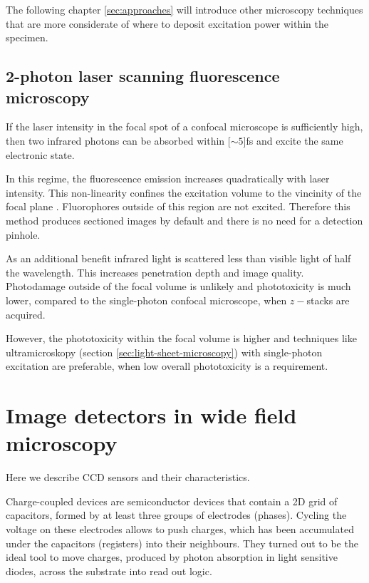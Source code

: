 The following chapter \ref{sec:approaches} will introduce other
microscopy techniques that are more considerate of where to deposit
excitation power within the specimen.
\subsection{2-photon laser scanning fluorescence microscopy}
\label{sec:2-photon}
If the laser intensity in the focal spot of a confocal microscope is
sufficiently high, then two infrared photons can be absorbed within
\unit[$\sim 5$]{fs} and excite the same electronic state.

In this regime, the fluorescence emission increases quadratically with
laser intensity. This non-linearity confines the excitation volume to
the vincinity of the focal plane \citep{Denk1990}. Fluorophores
outside of this region are not excited. Therefore this method produces
sectioned images by default and there is no need for a detection
pinhole.

As an additional benefit infrared light is scattered less than visible
light of half the wavelength. This increases penetration depth and
image quality. Photodamage outside of the focal volume is unlikely and
phototoxicity is much lower, compared to the single-photon confocal
microscope, when $z-$stacks are acquired.

However, the phototoxicity within the focal volume is higher and
techniques like ultramicroskopy (section
\ref{sec:light-sheet-microscopy}) with single-photon excitation are
preferable, when low overall phototoxicity is a requirement.

\section{Image detectors in wide field microscopy}
\label{sec:ccd-intro}
\begin{summary}
  Here we describe CCD
  sensors and their characteristics.
\end{summary}
Charge-coupled devices are semiconductor devices that contain a 2D
grid of capacitors, formed by at least three groups of electrodes
(phases). Cycling the voltage on these electrodes allows to push
charges, which has been accumulated under the capacitors (registers)
into their neighbours. They turned out to be the ideal tool to move
charges, produced by photon absorption in light sensitive diodes,
across the substrate into read out logic.

